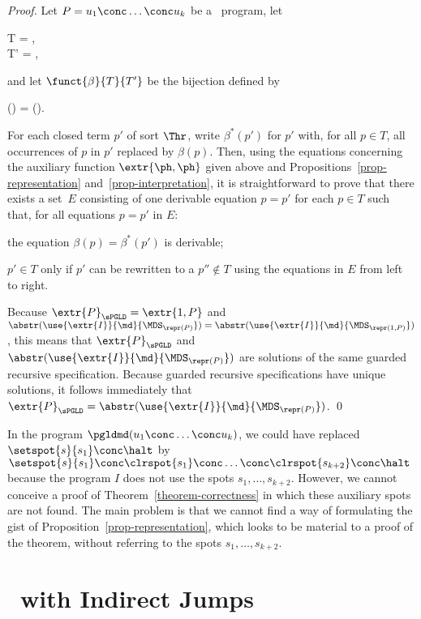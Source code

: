 \documentclass[fleqn]{llncs}
\begin{document}
\begin{proof}
Let $P = u_1 \conc \ldots \conc u_k$ be a \PGLD\ program,
let
\begin{ldispl}
T  = \;, \\
T' = \;,
\end{ldispl}
and let $\funct{\beta}{T}{T'}$ be the bijection defined by
\begin{ldispl}
\beta() =
\abstr()\;.
\end{ldispl}
For each closed term $p'$ of sort $\Thr$, write $\beta^*(p')$ for $p'$
with, for all $p \in T$, all occurrences of $p$ in $p'$ replaced by
$\beta(p)$.
Then, using the equations concerning the auxiliary function
$\extr{\ph,\ph}$ given above and Propositions~\ref{prop-representation}
and~\ref{prop-interpretation}, it is straightforward to prove that there
exists a set~$E$ consisting of one derivable equation $p = p'$ for each
$p \in T$ such that, for all equations $p = p'$ in $E$:
\begin{iteml}
\item
the equation $\beta(p) = \beta^*(p')$ is derivable;
\item
$p' \in T$ only if $p'$ can be rewritten to a $p'' \not\in T$ using the
equations in $E$ from left to right.
\end{iteml}
Because
$\extr{P}_\sPGLD = \extr{1,P}$ and
$\abstr(\use{\extr{I}}{\md}{\MDS_{\repr(P)}}) =
 \abstr(\use{\extr{I}}{\md}{\MDS_{\repr(1,P)}})$,
this means that
$\extr{P}_\sPGLD$ and $\abstr(\use{\extr{I}}{\md}{\MDS_{\repr(P)}})$
are solutions of the same guarded recursive specification.
Because guarded recursive specifications have unique solutions, it
follows immediately that
$\extr{P}_\sPGLD = \abstr(\use{\extr{I}}{\md}{\MDS_{\repr(P)}})$.
\qed
\end{proof}
In the program $\pgldmd(u_1 \conc \ldots \conc u_k)$, we could have
replaced $\setspot{s}{s_1} \conc \halt$ by
$\setspot{s}{s_1} \conc
 \clrspot{s_1} \conc \ldots \conc \clrspot{s_{k+2}} \conc \halt$
because the program $I$ does not use the spots $s_1,\ldots,s_{k+2}$.
However, we cannot conceive a proof of Theorem~\ref{theorem-correctness}
in which these auxiliary spots are not found.
The main problem is that we cannot find a way of formulating the gist of
Proposition~\ref{prop-representation}, which looks to be material to a
proof of the theorem, without referring to the spots
$s_1,\ldots,s_{k+2}$.

\section{\PGLD\ with Indirect Jumps}
\label{sect-PGLDij}
\end{document}
